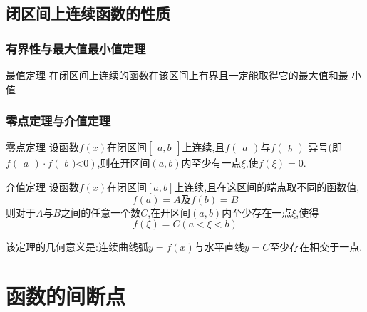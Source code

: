 \documentclass[12pt, a4paper, oneside, UTF8]{ctexbook}
\begin{document}
\begin{sloppypar}
    \subsection{闭区间上连续函数的性质}

    \subsubsection{有界性与最大值最小值定理}
    \begin{defn}{最值定理}{}
        在闭区间上连续的函数在该区间上有界且一定能取得它的最大值和最 小值
    \end{defn}
    \subsubsection{零点定理与介值定理}
    \begin{defn}{零点定理}{}
        设函数$f(x)$在闭区间$\left[\begin{array}{c}a,b\end{array}\right]$上连续,且$f(\begin{array}{c}a\end{array})$与$f(\begin{array}{c}b\end{array})$ 异号(即$f(\begin{array}{c}a\end{array})\cdot f(\textit{ b )<}0)$,则在开区间$(a,b)$内至少有一点$\xi$,使$f(\xi)=0$.
    \end{defn}
    \begin{defn}{介值定理}{}
        设函数$f(x)$在闭区间$[a,b]$上连续,且在这区间的端点取不同的函数值,
        $$
            f(a)=A \text{及} f(b)=B
        $$
        则对于$A$与$B$之间的任意一个数$C$,在开区间$(a,b)$内至少存在一点$\xi$,使得
        $$
            f(\xi) =C (a< \xi <b)
        $$
    \end{defn}
    该定理的几何意义是:连续曲线弧$y=f(x)$与水平直线$y=C$至少存在相交于一点.
    \section{函数的间断点}

\end{sloppypar}
\end{document}

